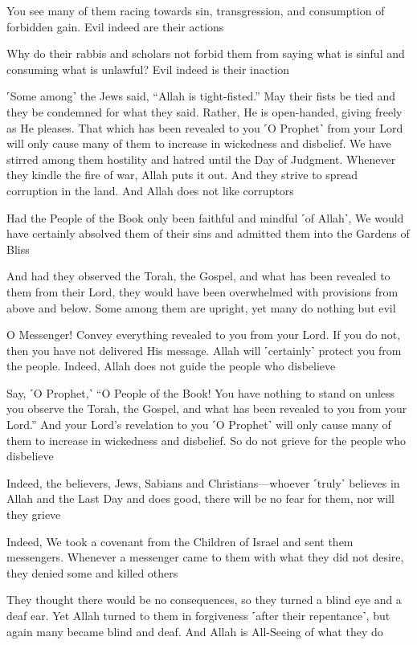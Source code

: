You see many of them racing towards sin, transgression, and consumption of forbidden gain. Evil indeed are their actions

Why do their rabbis and scholars not forbid them from saying what is sinful and consuming what is unlawful? Evil indeed is their inaction

˹Some among˺ the Jews said, “Allah is tight-fisted.” May their fists be tied and they be condemned for what they said. Rather, He is open-handed, giving freely as He pleases. That which has been revealed to you ˹O Prophet˺ from your Lord will only cause many of them to increase in wickedness and disbelief. We have stirred among them hostility and hatred until the Day of Judgment. Whenever they kindle the fire of war, Allah puts it out. And they strive to spread corruption in the land. And Allah does not like corruptors

Had the People of the Book only been faithful and mindful ˹of Allah˺, We would have certainly absolved them of their sins and admitted them into the Gardens of Bliss

And had they observed the Torah, the Gospel, and what has been revealed to them from their Lord, they would have been overwhelmed with provisions from above and below. Some among them are upright, yet many do nothing but evil

O Messenger! Convey everything revealed to you from your Lord. If you do not, then you have not delivered His message. Allah will ˹certainly˺ protect you from the people. Indeed, Allah does not guide the people who disbelieve

Say, ˹O Prophet,˺ “O People of the Book! You have nothing to stand on unless you observe the Torah, the Gospel, and what has been revealed to you from your Lord.” And your Lord’s revelation to you ˹O Prophet˺ will only cause many of them to increase in wickedness and disbelief. So do not grieve for the people who disbelieve

Indeed, the believers, Jews, Sabians and Christians—whoever ˹truly˺ believes in Allah and the Last Day and does good, there will be no fear for them, nor will they grieve

Indeed, We took a covenant from the Children of Israel and sent them messengers. Whenever a messenger came to them with what they did not desire, they denied some and killed others

They thought there would be no consequences, so they turned a blind eye and a deaf ear. Yet Allah turned to them in forgiveness ˹after their repentance˺, but again many became blind and deaf. And Allah is All-Seeing of what they do

